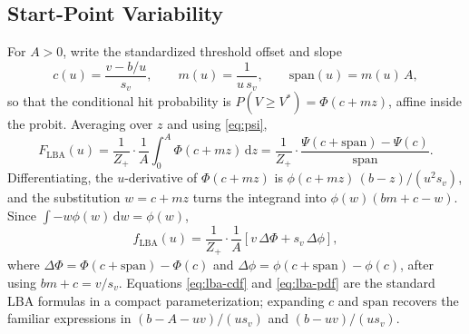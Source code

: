 \documentclass[12pt]{article}
\newcommand{\dd}{\,\mathrm{d}}
\newcommand{\PhiN}{\Phi}
\newcommand{\phiN}{\phi}
\theoremstyle{remark}
\begin{document}
\subsection{Start-Point Variability}
\label{sec:lba-startpoint}
For $A > 0$, write the standardized threshold offset and slope
\begin{equation}
  c(u) = \frac{v - b/u}{s_v},
  \qquad
  m(u) = \frac{1}{u\,s_v},
  \qquad
  \mathrm{span}(u) = m(u)\,A,
  \label{eq:lba-cm}
\end{equation}
so that the conditional hit probability is $P(V \ge V^{*}) = \PhiN(c + mz)$, affine inside the probit. Averaging over $z$ and using \eqref{eq:psi},
\begin{equation}
  F_{\mathrm{LBA}}(u)
  = \frac{1}{Z_+}\cdot\frac{1}{A}\int_0^A \PhiN(c + mz)\dd z
  = \frac{1}{Z_+}\cdot\frac{\Psi(c+\mathrm{span}) - \Psi(c)}{\mathrm{span}}.
  \label{eq:lba-cdf}
\end{equation}
Differentiating, the $u$-derivative of $\PhiN(c+mz)$ is $\phiN(c+mz)\,(b-z)/(u^2 s_v)$, and the substitution $w = c + mz$ turns the integrand into $\phiN(w)(bm + c - w)$. Since $\int -w\phiN(w)\dd w = \phiN(w)$,
\begin{equation}
  f_{\mathrm{LBA}}(u)
  = \frac{1}{Z_+}\cdot\frac{1}{A}
    \left[v\,\Delta\PhiN + s_v\,\Delta\phiN\right],
  \label{eq:lba-pdf}
\end{equation}
where $\Delta\PhiN = \PhiN(c+\mathrm{span}) - \PhiN(c)$ and $\Delta\phiN = \phiN(c+\mathrm{span}) - \phiN(c)$, after using $bm + c = v/s_v$. Equations \eqref{eq:lba-cdf} and \eqref{eq:lba-pdf} are the standard LBA formulas in a compact parameterization; expanding $c$ and $\mathrm{span}$ recovers the familiar expressions in $(b-A-uv)/(u s_v)$ and $(b-uv)/(u s_v)$.
\end{document}
